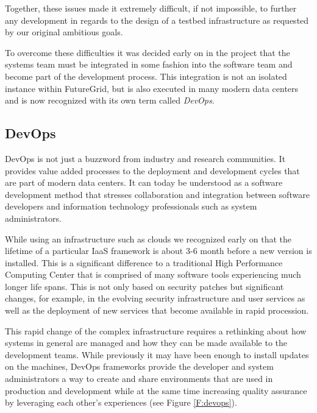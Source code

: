 \documentclass[graybox]{svmult}
\begin{document}
Together, these issues made it extremely difficult, if not impossible, to further any development in regards to the design of a testbed infrastructure as requested by our original ambitious goals.


To overcome these difficulties it was decided early on in the project that the systems team must be integrated in some fashion into the software team and become part of the development process. This integration is not an isolated instance within FutureGrid, but is also executed in many modern data centers and is now recognized with its own term called {\em DevOps}.


\subsection{DevOps}


DevOps is not just a buzzword from industry and research communities. It provides value added processes to the deployment and development cycles that are part of modern data centers. It can today be understood as a software development method that stresses collaboration and integration between software developers and information technology professionals such as system administrators.


While using an infrastructure such as clouds we recognized early on that the lifetime of a particular IaaS framework is about 3-6 month before a new version is installed. This is a significant difference to a traditional High Performance Computing Center that is comprised of many software tools experiencing much longer life spans. This is not only based on security patches but significant changes, for example, in the evolving security infrastructure and  user services as well as the deployment of new services that become available in rapid procession.


This rapid change of the complex infrastructure requires a rethinking about how systems in general are managed and how they can be made available to the development teams. While previously it may have been enough to install updates on the machines, DevOps frameworks provide the developer and system administrators a way to create and share environments that are used in production and development while at the same time increasing quality assurance by leveraging each other’s experiences (see Figure \ref{F:devops}).
\end{document}
